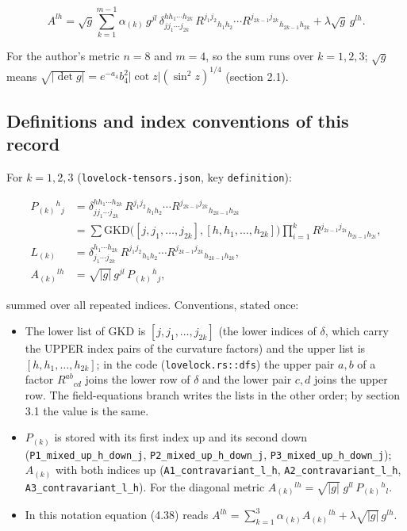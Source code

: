 \documentclass[11pt]{article}
\begin{document}
\[
A^{lh} = \sqrt{g}\sum_{k=1}^{m-1}\alpha_{(k)}\,g^{jl}\,\delta^{hh_1\cdots h_{2k}}_{jj_1\cdots j_{2k}}\,R^{j_1j_2}{}_{h_1h_2}\cdots R^{j_{2k-1}j_{2k}}{}_{h_{2k-1}h_{2k}} + \lambda\sqrt{g}\,g^{lh} .
\]

For the author's metric $n = 8$ and $m = 4$, so the sum runs over $k = 1, 2, 3$; $\sqrt{g}$ means $\sqrt{|\det g|} = e^{-a_4}b_4^2|\cot z|(\sin^2z)^{1/4}$ (section 2.1).

\subsection{Definitions and index conventions of this record}

For $k = 1, 2, 3$ (\texttt{lovelock\allowbreak{}-tensors\allowbreak{}.json}, key \texttt{definiti\allowbreak{}on}):

\[
\begin{aligned}
P_{(k)}{}^h{}_j &= \delta^{hh_1\cdots h_{2k}}_{jj_1\cdots j_{2k}}\,R^{j_1j_2}{}_{h_1h_2}\cdots R^{j_{2k-1}j_{2k}}{}_{h_{2k-1}h_{2k}} \\
&= \sum \mathrm{GKD}\big([j,j_1,\dots,j_{2k}],[h,h_1,\dots,h_{2k}]\big)\prod_{i=1}^{k}R^{j_{2i-1}j_{2i}}{}_{h_{2i-1}h_{2i}} ,\\
L_{(k)} &= \delta^{h_1\cdots h_{2k}}_{j_1\cdots j_{2k}}\,R^{j_1j_2}{}_{h_1h_2}\cdots R^{j_{2k-1}j_{2k}}{}_{h_{2k-1}h_{2k}} ,\\
A_{(k)}{}^{lh} &= \sqrt{|g|}\,g^{jl}\,P_{(k)}{}^h{}_j ,
\end{aligned}
\]

summed over all repeated indices. Conventions, stated once:

\begin{itemize}
\item The lower list of GKD is $[j, j_1, \dots, j_{2k}]$ (the lower indices of $\delta$, which carry the UPPER index pairs of the curvature factors) and the upper list is $[h, h_1, \dots, h_{2k}]$; in the code (\texttt{lovelock\allowbreak{}.rs::dfs}) the upper pair $a, b$ of a factor $R^{ab}{}_{cd}$ joins the lower row of $\delta$ and the lower pair $c, d$ joins the upper row. The field-equations branch writes the lists in the other order; by section 3.1 the value is the same.
\item $P_{(k)}$ is stored with its first index up and its second down (\texttt{P1\_mixed\allowbreak{}\_up\_h\_do\allowbreak{}wn\_j}, \texttt{P2\_mixed\allowbreak{}\_up\_h\_do\allowbreak{}wn\_j}, \texttt{P3\_mixed\allowbreak{}\_up\_h\_do\allowbreak{}wn\_j}); $A_{(k)}$ with both indices up (\texttt{A1\_contr\allowbreak{}avariant\allowbreak{}\_l\_h}, \texttt{A2\_contr\allowbreak{}avariant\allowbreak{}\_l\_h}, \texttt{A3\_contr\allowbreak{}avariant\allowbreak{}\_l\_h}). For the diagonal metric $A_{(k)}{}^{lh} = \sqrt{|g|}\;g^{ll}\,P_{(k)}{}^h{}_l$.
\item In this notation equation (4.38) reads $A^{lh} = \sum_{k=1}^{3}\alpha_{(k)}A_{(k)}{}^{lh} + \lambda\sqrt{|g|}\,g^{lh}$.
\end{itemize}
\end{document}
